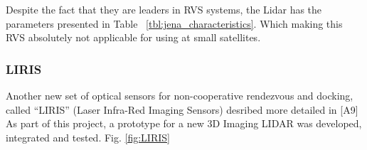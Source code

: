 \begin{figure}[H]
\begin{floatrow}
\end{floatrow}
\end{figure}

Despite the fact that they are leaders in RVS systems, the Lidar has the parameters presented in Table ~\ref{tbl:jena_characteristics}.
Which making this RVS absolutely not applicable for using at small satellites.

\subsubsection{LIRIS}
Another new set of optical sensors for non-cooperative rendezvous and docking, called “LIRIS” (Laser Infra-Red Imaging Sensors) desribed more detailed in [A9]
As part of this project, a prototype for a new 3D Imaging LIDAR was developed, integrated and tested. Fig. \ref{fig:LIRIS}

